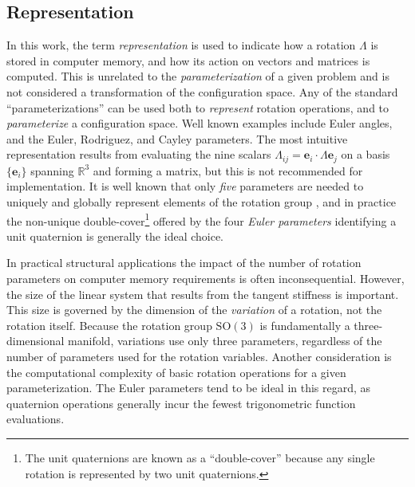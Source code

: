 \hypertarget{representation}{%
\subsection{Representation}\label{representation}}

In this work, the term \emph{representation} is used to indicate how a
rotation \(\bm{\varLambda}\) is stored in computer memory, and how
its action on vectors and matrices is computed.
This is unrelated to the \emph{parameterization} of a given problem and is not considered a transformation of the configuration space.
Any of the standard ``parameterizations'' can be used both to \emph{represent}
rotation operations, and to \emph{parameterize} a configuration space.
Well known examples %
include Euler angles, and the Euler, Rodriguez, and Cayley parameters.
The most intuitive representation results from evaluating the nine scalars
\(\varLambda_{ij} = \mathbf{e}_i\cdot\bm{\varLambda}\mathbf{e}_j\) on a basis
\(\{\mathbf{e}_i\}\) spanning \(\mathbb{R}^3\) and forming a matrix, but
this is not recommended for implementation. It is well known that only
\emph{five} parameters are needed to uniquely and globally represent
elements of the rotation group \citep{stuelpnagel1964parametrization},
and in practice the non-unique double-cover\footnote{The unit quaternions are known as a ``double-cover'' because any single rotation is represented by two unit quaternions.} 
offered by the four \emph{Euler parameters} identifying a unit quaternion is generally the ideal choice.

In practical structural applications the impact of
the number of rotation parameters on computer memory requirements is often
inconsequential.
However, the size of the linear system that results from the tangent stiffness is important. 
This size is governed by the dimension of the \emph{variation} of a rotation, not the rotation itself. 
Because the rotation group \(\mathrm{SO}(3)\) is fundamentally a three-dimensional manifold, variations use only three parameters, regardless of the number of parameters used for the rotation variables.
Another consideration is the computational complexity of basic rotation operations for a given parameterization. 
The Euler parameters tend to be ideal in this regard, as quaternion operations generally incur the fewest trigonometric function evaluations.


